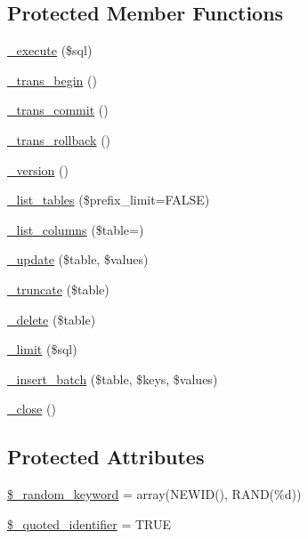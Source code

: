 \subsection*{Protected Member Functions}
\begin{DoxyCompactItemize}
\item 
\mbox{\hyperlink{class_c_i___d_b__mssql__driver_a114ab675d89bf8324a41785fb475e86d}{\+\_\+execute}} (\$sql)
\item 
\mbox{\hyperlink{class_c_i___d_b__mssql__driver_ac81ac882c1d54347d810199a15856aac}{\+\_\+trans\+\_\+begin}} ()
\item 
\mbox{\hyperlink{class_c_i___d_b__mssql__driver_a6fe7f373e0b11cfae23a5f41c0b35dda}{\+\_\+trans\+\_\+commit}} ()
\item 
\mbox{\hyperlink{class_c_i___d_b__mssql__driver_ad49a116b0776c26b53114c9093fd102a}{\+\_\+trans\+\_\+rollback}} ()
\item 
\mbox{\hyperlink{class_c_i___d_b__mssql__driver_ac997a462bb342f97f414910f0e033fb6}{\+\_\+version}} ()
\item 
\mbox{\hyperlink{class_c_i___d_b__mssql__driver_a435c0f3ce54fe7daa178baa8532ebd54}{\+\_\+list\+\_\+tables}} (\$prefix\+\_\+limit=F\+A\+L\+SE)
\item 
\mbox{\hyperlink{class_c_i___d_b__mssql__driver_a7ccb7f9c301fe7f0a9db701254142b63}{\+\_\+list\+\_\+columns}} (\$table=\textquotesingle{}\textquotesingle{})
\item 
\mbox{\hyperlink{class_c_i___d_b__mssql__driver_a2540b03a93fa73ae74c10d0e16fc073e}{\+\_\+update}} (\$table, \$values)
\item 
\mbox{\hyperlink{class_c_i___d_b__mssql__driver_aa029600528fc1ce660a23ff4b4667f95}{\+\_\+truncate}} (\$table)
\item 
\mbox{\hyperlink{class_c_i___d_b__mssql__driver_a133ea8446ded52589bd22cc9163d0896}{\+\_\+delete}} (\$table)
\item 
\mbox{\hyperlink{class_c_i___d_b__mssql__driver_a3a02ea06541b8ecc25a33a61651562c8}{\+\_\+limit}} (\$sql)
\item 
\mbox{\hyperlink{class_c_i___d_b__mssql__driver_a1978e1358c812587a46e242630365099}{\+\_\+insert\+\_\+batch}} (\$table, \$keys, \$values)
\item 
\mbox{\hyperlink{class_c_i___d_b__mssql__driver_a4d9082658000e5ede8312067c6dda9db}{\+\_\+close}} ()
\end{DoxyCompactItemize}
\subsection*{Protected Attributes}
\begin{DoxyCompactItemize}
\item 
\mbox{\hyperlink{class_c_i___d_b__mssql__driver_a10213aa6e05f6d924d3277bb1d2fea00}{\$\+\_\+random\+\_\+keyword}} = array(\textquotesingle{}N\+E\+W\+ID()\textquotesingle{}, \textquotesingle{}R\+A\+ND(\%d)\textquotesingle{})
\item 
\mbox{\hyperlink{class_c_i___d_b__mssql__driver_a1dae2f0e9ad7299438a9976d6cdbf2ad}{\$\+\_\+quoted\+\_\+identifier}} = T\+R\+UE
\end{DoxyCompactItemize}


